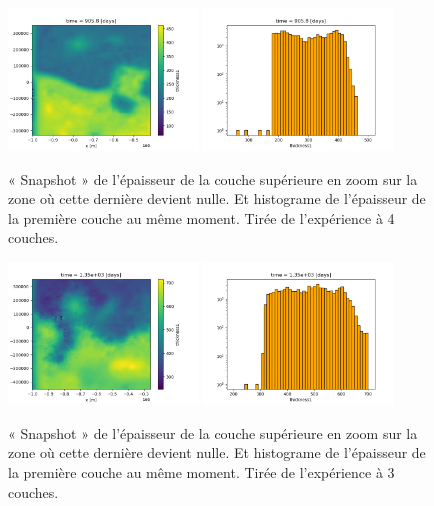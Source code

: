 \documentclass[10pt]{article}
\numberwithin{equation}{section}
\begin{document}
\begin{figure}[!htpb]
\centering
\includegraphics[width=0.45\textwidth]{figures/debuggage/2023_10_16_thickness_closeup.png} \includegraphics[width=0.45\textwidth]{figures/debuggage/2023_10_16_thickness_histo2.png}
\caption{« Snapshot » de l'épaisseur de la couche supérieure en zoom sur la zone où cette dernière devient nulle. Et histograme de l'épaisseur de la première couche au même moment. Tirée de l'expérience à 4 couches.}
\label{fig:thickness-close}
\end{figure}

\begin{figure}[!htpb]
\centering
\includegraphics[width=0.45\textwidth]{figures/debuggage/2023_10_16_thickness_closeup2.png}
\includegraphics[width=0.45\textwidth]{figures/debuggage/2023_10_16_thickness_histo.png}
\caption{ « Snapshot » de l'épaisseur de la couche supérieure en zoom sur la zone où cette dernière devient nulle. Et histograme de l'épaisseur de la première couche au même moment. Tirée de l'expérience à 3 couches.}
\label{fig:thickness-close2}
\end{figure}
\end{document}
